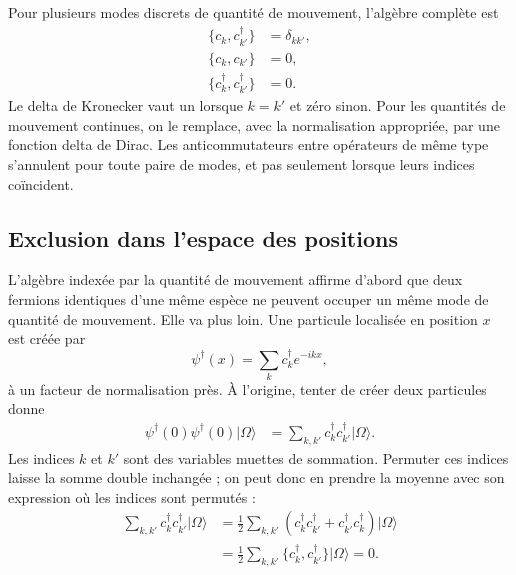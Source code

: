 \begin{classroomqa}
\end{classroomqa}

Pour plusieurs modes discrets de quantité de mouvement, l’algèbre complète est
\begin{align}
\{c_k,c_{k'}^\dagger\}&=\delta_{kk'},
\\
\{c_k,c_{k'}\}&=0,
\\
\{c_k^\dagger,c_{k'}^\dagger\}&=0.
\end{align}
Le delta de Kronecker vaut un lorsque \(k=k'\) et zéro sinon. Pour les quantités de mouvement continues, on le remplace, avec la normalisation appropriée, par une fonction delta de Dirac. Les anticommutateurs entre opérateurs de même type s’annulent pour toute paire de modes, et pas seulement lorsque leurs indices coïncident.

\subsection{Exclusion dans l’espace des positions}

L’algèbre indexée par la quantité de mouvement affirme d’abord que deux fermions identiques d’une même espèce ne peuvent occuper un même mode de quantité de mouvement. Elle va plus loin. Une particule localisée en position \(x\) est créée par
\begin{equation}
\psi^\dagger(x)=\sum_k c_k^\dagger e^{-ikx},
\end{equation}
à un facteur de normalisation près. À l’origine, tenter de créer deux particules donne
\begin{align}
\psi^\dagger(0)\psi^\dagger(0)|\Omega\rangle
&=\sum_{k,k'}c_k^\dagger c_{k'}^\dagger|\Omega\rangle.
\end{align}
Les indices \(k\) et \(k'\) sont des variables muettes de sommation. Permuter ces indices laisse la somme double inchangée ; on peut donc en prendre la moyenne avec son expression où les indices sont permutés :
\begin{align}
\sum_{k,k'}c_k^\dagger c_{k'}^\dagger|\Omega\rangle
&=\frac12\sum_{k,k'}
\left(c_k^\dagger c_{k'}^\dagger
+c_{k'}^\dagger c_k^\dagger\right)|\Omega\rangle
\\
&=\frac12\sum_{k,k'}
\{c_k^\dagger,c_{k'}^\dagger\}|\Omega\rangle
=0.
\end{align}

